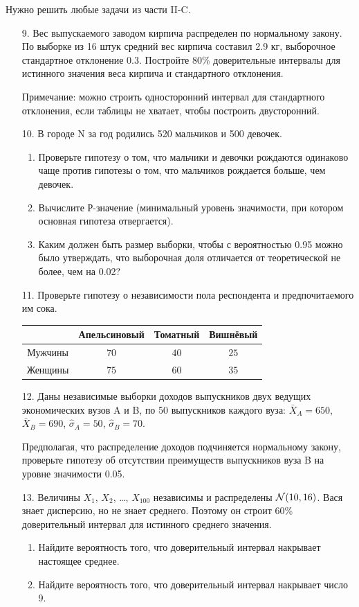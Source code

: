 Нужно решить любые \textbf{} задачи из части II-C.

\begin{enumerate}
\item[9.] Вес выпускаемого заводом кирпича распределен по нормальному закону. По выборке из 16 штук средний вес кирпича составил 2.9 кг, выборочное стандартное отклонение 0.3. Постройте 80\% доверительные интервалы для истинного значения веса кирпича и стандартного отклонения.

Примечание: можно строить односторонний интервал для стандартного отклонения, если таблицы не хватает, чтобы построить двусторонний.

\item[10.] В городе N за год родились 520 мальчиков и 500 девочек.
\begin{enumerate}
\item Проверьте гипотезу о том, что мальчики и девочки рождаются одинаково чаще против гипотезы о том, что мальчиков рождается больше, чем девочек.
\item Вычислите Р-значение (минимальный уровень значимости, при котором основная гипотеза отвергается).
\item Каким должен быть размер выборки, чтобы с вероятностью 0.95 можно было утверждать, что выборочная доля отличается от теоретической не более, чем на 0.02?
\end{enumerate}

\item[11.] Проверьте гипотезу о независимости пола респондента и предпочитаемого им сока.

\begin{tabular}{@{}cccc@{}}
\toprule
  & Апельсиновый & Томатный & Вишнёвый \\ \midrule
Мужчины & $70$         & $40$     & $25$     \\
Женщины & $75$         & $60$     & $35$     \\ \bottomrule
\end{tabular}

\item[12.] Даны независимые выборки доходов выпускников двух ведущих экономических вузов A и B, по 50 выпускников каждого вуза: $\bar{X}_{A}=650$, $\bar{X}_{B}=690$, $\hat{\sigma}_{A}=50$, $\hat{\sigma}_{B}=70$.

Предполагая, что распределение доходов подчиняется нормальному закону, проверьте гипотезу об отсутствии преимуществ выпускников вуза B на уровне значимости 0.05.

\item[13.] Величины $X_{1}$, $X_{2}$, \ldots, $X_{100}$ независимы и распределены $\mathcal{N}(10,16)$. Вася знает дисперсию, но не знает среднего. Поэтому он строит 60\% доверительный интервал для истинного среднего значения.
\begin{enumerate}
\item Найдите вероятность того, что доверительный интервал накрывает настоящее среднее.
\item Найдите вероятность того, что доверительный интервал накрывает число 9.
\end{enumerate}
\end{enumerate}

